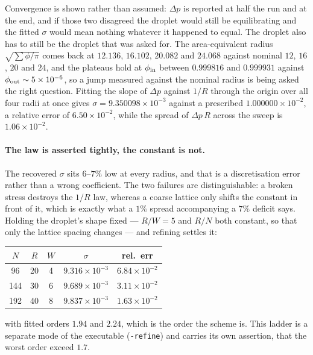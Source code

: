 \documentclass[11pt,a4paper]{article}
\newcommand{\code}[1]{\texttt{\small #1}}
\newcommand{\e}[1]{\times 10^{#1}}
\begin{document}
\noindent Convergence is shown rather than assumed: $\Delta p$ is reported at
half the run and at the end, and if those two disagreed the droplet would still
be equilibrating and the fitted $\sigma$ would mean nothing whatever it happened
to equal. The droplet also has to still be the droplet that was asked for. The
area-equivalent radius $\sqrt{\sum\phi/\pi}$ comes back at $12.136$, $16.102$,
$20.082$ and $24.068$ against nominal $12$, $16$, $20$ and $24$, and the plateaus
hold at $\phi_{\rm in}$ between $0.999816$ and $0.999931$ against
$\phi_{\rm out}\sim5\e{-6}$, so a jump measured against the nominal radius is
being asked the right question. Fitting the slope of $\Delta p$ against $1/R$
through the origin over all four radii at once gives
$\sigma = 9.350098\e{-3}$ against a prescribed $1.000000\e{-2}$, a relative error
of $6.50\e{-2}$, while the spread of $\Delta p\,R$ across the sweep is
$1.06\e{-2}$.

\paragraph{The law is asserted tightly, the constant is not.} The recovered
$\sigma$ sits $6$--$7\%$ low at every radius, and that is a discretisation error
rather than a wrong coefficient. The two failures are distinguishable: a broken
stress destroys the $1/R$ law, whereas a coarse lattice only shifts the constant
in front of it, which is exactly what a $1\%$ spread accompanying a $7\%$ deficit
says. Holding the droplet's shape fixed --- $R/W=5$ and $R/N$ both constant, so
that only the lattice spacing changes --- and refining settles it:

\begin{center}\small
\begin{tabular}{ccccc}
\toprule
$N$ & $R$ & $W$ & $\sigma$ & rel.\ err \\
\midrule
 96 & 20 & 4 & $9.316\e{-3}$ & $6.84\e{-2}$ \\
144 & 30 & 6 & $9.689\e{-3}$ & $3.11\e{-2}$ \\
192 & 40 & 8 & $9.837\e{-3}$ & $1.63\e{-2}$ \\
\bottomrule
\end{tabular}
\end{center}

\noindent with fitted orders $1.94$ and $2.24$, which is the order the scheme is.
This ladder is a separate mode of the executable (\code{-refine}) and carries its
own assertion, that the worst order exceed $1.7$.
\end{document}
